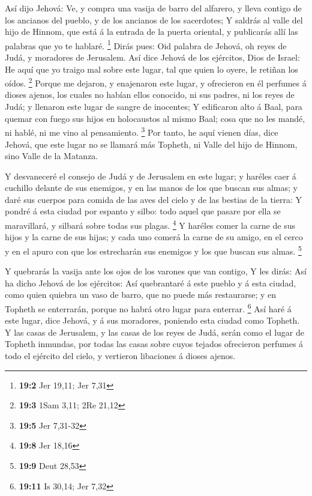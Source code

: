  Así dijo Jehová: Ve, y compra una vasija de barro del
alfarero, y lleva contigo de los ancianos del pueblo, y de los ancianos
de los sacerdotes;  Y saldrás al valle del hijo de Hinnom,
que está á la entrada de la puerta oriental, y publicarás allí las
palabras que yo te hablaré. \footnote{\textbf{19:2} Jer 19,11; Jer 7,31}
 Dirás pues: Oid palabra de Jehová, oh reyes de Judá, y
moradores de Jerusalem. Así dice Jehová de los ejércitos, Dios de
Israel: He aquí que yo traigo mal sobre este lugar, tal que quien lo
oyere, le retiñan los oídos. \footnote{\textbf{19:3} 1Sam 3,11; 2Re
  21,12}  Porque me dejaron, y enajenaron este lugar, y
ofrecieron en él perfumes á dioses ajenos, los cuales no habían ellos
conocido, ni sus padres, ni los reyes de Judá; y llenaron este lugar de
sangre de inocentes;  Y edificaron alto á Baal, para
quemar con fuego sus hijos en holocaustos al mismo Baal; cosa que no les
mandé, ni hablé, ni me vino al pensamiento. \footnote{\textbf{19:5} Jer
  7,31-32}  Por tanto, he aquí vienen días, dice Jehová,
que este lugar no se llamará más Topheth, ni Valle del hijo de Hinnom,
sino Valle de la Matanza.

 Y desvaneceré el consejo de Judá y de Jerusalem en este
lugar; y haréles caer á cuchillo delante de sus enemigos, y en las manos
de los que buscan sus almas; y daré sus cuerpos para comida de las aves
del cielo y de las bestias de la tierra:  Y pondré á esta
ciudad por espanto y silbo: todo aquel que pasare por ella se
maravillará, y silbará sobre todas sus plagas. \footnote{\textbf{19:8}
  Jer 18,16}  Y haréles comer la carne de sus hijos y la
carne de sus hijas; y cada uno comerá la carne de su amigo, en el cerco
y en el apuro con que los estrecharán sus enemigos y los que buscan sus
almas. \footnote{\textbf{19:9} Deut 28,53}

 Y quebrarás la vasija ante los ojos de los varones que
van contigo,  Y les dirás: Así ha dicho Jehová de los
ejércitos: Así quebrantaré á este pueblo y á esta ciudad, como quien
quiebra un vaso de barro, que no puede más restaurarse; y en Topheth se
enterrarán, porque no habrá otro lugar para enterrar. \footnote{\textbf{19:11}
  Is 30,14; Jer 7,32}  Así haré á este lugar, dice
Jehová, y á sus moradores, poniendo esta ciudad como Topheth.
 Y las casas de Jerusalem, y las casas de los reyes de
Judá, serán como el lugar de Topheth inmundas, por todas las casas sobre
cuyos tejados ofrecieron perfumes á todo el ejército del cielo, y
vertieron libaciones á dioses ajenos.

